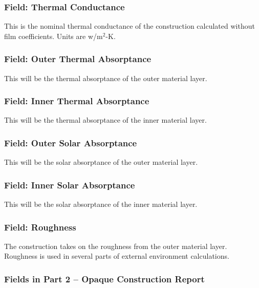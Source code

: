 \subsubsection{Field: Thermal Conductance}\label{field-thermal-conductance}

This is the nominal thermal conductance of the construction calculated without film coefficients. Units are w/m\(^{2}\)-K.

\subsubsection{Field: Outer Thermal Absorptance}\label{field-outer-thermal-absorptance}

This will be the thermal absorptance of the outer material layer.

\subsubsection{Field: Inner Thermal Absorptance}\label{field-inner-thermal-absorptance}

This will be the thermal absorptance of the inner material layer.

\subsubsection{Field: Outer Solar Absorptance}\label{field-outer-solar-absorptance}

This will be the solar absorptance of the outer material layer.

\subsubsection{Field: Inner Solar Absorptance}\label{field-inner-solar-absorptance}

This will be the solar absorptance of the inner material layer.

\subsubsection{Field: Roughness}\label{field-roughness}

The construction takes on the roughness from the outer material layer. Roughness is used in several parts of external environment calculations.

\subsubsection{Fields in Part 2 -- Opaque Construction Report}\label{fields-in-part-2-opaque-construction-report}

